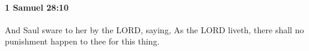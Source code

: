 
		\paragraph{1 Samuel 28:10} %
			\label{1SAMUEL-28-10}

			And Saul sware to her by the LORD, saying, As the LORD liveth, there shall no punishment happen to thee for this thing.


